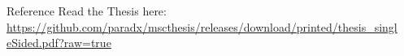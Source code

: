 \documentclass[final,20pt]{beamer}
\newlength{\sepwidth}
\newlength{\colwidth}
\newcommand{\separatorcolumn}{\begin{column}{\sepwidth}\end{column}}
\begin{document}
\begin{frame}[t]
\begin{columns}[t]
\begin{column}{\colwidth}
  \vspace{-1.5cm}
  \begin{block}{Reference}
    Read the Thesis here:\\
      \href{https://github.com/paradx/mscthesis/releases/download/printed/thesis\_singleSided.pdf?raw=true}{https://github.com/paradx/mscthesis/releases/download/printed/thesis\_singleSided.pdf?raw=true}
  \end{block}

\end{column}

\separatorcolumn%
\end{columns}
\end{frame}
\end{document}
